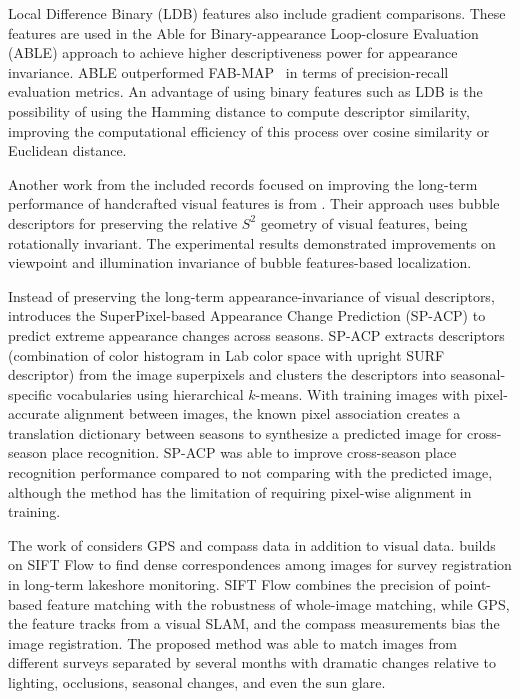 Local Difference Binary (LDB) features also include gradient comparisons. These features are used in the Able for Binary-appearance Loop-closure Evaluation (ABLE) \parencite{arroyo-et-al:2018:7} approach to achieve higher descriptiveness power for appearance invariance.
ABLE outperformed FAB-MAP~\parencite{discussion:fab-map} in terms of precision-recall evaluation metrics. An advantage of using binary features such as LDB is the possibility of using the Hamming distance to compute descriptor similarity, improving the computational efficiency of this process over cosine similarity or Euclidean distance.

Another work from the included records focused on improving the long-term performance of handcrafted visual features is from \cite{karaoguz-bozma:2016:4}. Their approach uses bubble descriptors for preserving the relative $S^2$ geometry of visual features, being rotationally invariant. The experimental results demonstrated improvements on viewpoint and illumination invariance of bubble features-based localization.

Instead of preserving the long-term appearance-invariance of visual descriptors, \cite{neubert-et-al:2015:005} introduces the SuperPixel-based Appearance Change Prediction (SP-ACP) to predict extreme appearance changes across seasons.
SP-ACP extracts descriptors (combination of color histogram in Lab color space with upright SURF descriptor) from the image superpixels and clusters the descriptors into seasonal-specific vocabularies using hierarchical $k$-means.
With training images with pixel-accurate alignment between images, the known pixel association creates a translation dictionary between seasons to synthesize a predicted image for cross-season place recognition.
SP-ACP was able to improve cross-season place recognition performance compared to not comparing with the predicted image, although the method has the limitation of requiring pixel-wise alignment in training.

The work of \cite{griffith-pradalier:2017:21664} considers GPS and compass data in addition to visual data. \cite{griffith-pradalier:2017:21664} builds on SIFT Flow to find dense correspondences among images for survey registration in long-term lakeshore monitoring. SIFT Flow combines the precision of point-based feature matching with the robustness of whole-image matching, while GPS, the feature tracks from a visual SLAM, and the compass measurements bias the image registration. The proposed method was able to match images from different surveys separated by several months with dramatic changes relative to lighting, occlusions, seasonal changes, and even the sun glare.

